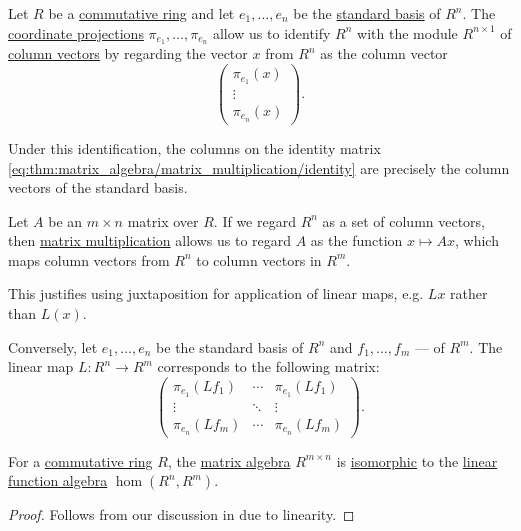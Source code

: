 \begin{remark}\label{rem:matrices_as_functions}
  Let \( R \) be a \hyperref[def:ring/commutative]{commutative ring} and let \( e_1, \ldots, e_n \) be the \hyperref[def:sequence_space]{standard basis} of \( R^n \). The \hyperref[def:basis_decomposition]{coordinate projections} \( \pi_{e_1}, \ldots, \pi_{e_n} \) allow us to identify \( R^n \) with the module \( R^{n \times 1} \) of \hyperref[def:array/column_vector]{column vectors} by regarding the vector \( x \) from \( R^n \) as the column vector
  \begin{equation*}
    \begin{pmatrix}
      \pi_{e_1}(x) \\
      \vdots \\
      \pi_{e_n}(x)
    \end{pmatrix}.
  \end{equation*}

  Under this identification, the columns on the identity matrix \eqref{eq:thm:matrix_algebra/matrix_multiplication/identity} are precisely the column vectors of the standard basis.

  Let \( A \) be an \( m \times n \) matrix over \( R \). If we regard \( R^n \) as a set of column vectors, then \hyperref[thm:matrix_algebra/matrix_multiplication]{matrix multiplication} allows us to regard \( A \) as the function \( x \mapsto Ax \), which maps column vectors from \( R^n \) to column vectors in \( R^m \).

  This justifies using juxtaposition for application of linear maps, e.g. \( Lx \) rather than \( L(x) \).

  Conversely, let \( e_1, \ldots, e_n \) be the standard basis of \( R^n \) and \( f_1, \ldots, f_m \) --- of \( R^m \). The linear map \( L: R^n \to R^m \) corresponds to the following matrix:
  \begin{equation*}
    \begin{pmatrix}
      \pi_{e_1}(L f_1) & \cdots & \pi_{e_1}(L f_1) \\
      \vdots           & \ddots & \vdots       \\
      \pi_{e_n}(L f_m) & \cdots & \pi_{e_n}(L f_m)
    \end{pmatrix}.
  \end{equation*}
\end{remark}

\begin{proposition}\label{thm:matrix_and_linear_function_algebras}
  For a \hyperref[def:ring/commutative]{commutative ring} \( R \), the \hyperref[thm:matrix_algebra]{matrix algebra} \( R^{m \times n} \) is \hyperref[def:algebra_over_semiring/homomorphism]{isomorphic} to the \hyperref[thm:functions_over_algebra]{linear function algebra} \( \hom(R^n, R^m) \).
\end{proposition}
\begin{proof}
  Follows from our discussion in  due to linearity.
\end{proof}


